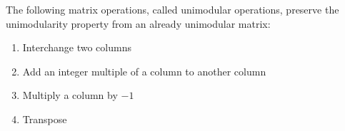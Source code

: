 \begin{lemma}
The following matrix operations, called unimodular operations, preserve the unimodularity property from an already unimodular matrix:
\begin{enumerate}
    \item Interchange two columns
    \item Add an integer multiple of a column to another column
    \item Multiply a column by $-1$
    \item Transpose
\end{enumerate}
\end{lemma}

